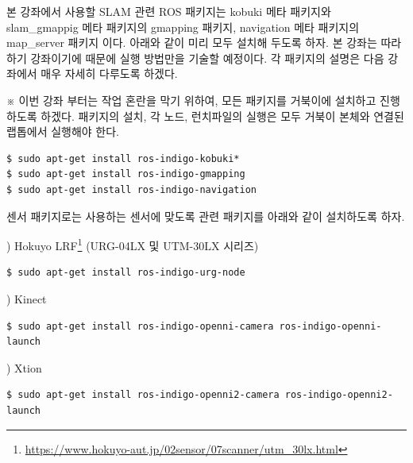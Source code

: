 본 강좌에서 사용할 SLAM 관련 ROS 패키지는 kobuki 메타 패키지와 slam\_gmappig 메타 패키지의 gmapping 패키지, navigation 메타 패키지의 map\_server 패키지 이다. 아래와 같이 미리 모두 설치해 두도록 하자. 본 강좌는 따라하기 강좌이기에 때문에 실행 방법만을 기술할 예정이다. 각 패키지의 설명은 다음 강좌에서 매우 자세히 다루도록 하겠다. 

※ 이번 강좌 부터는 작업 혼란을 막기 위하여, 모든 패키지를 거북이에 설치하고 진행하도록 하겠다. 패키지의 설치, 각 노드, 런치파일의 실행은 모두 거북이 본체와 연결된 랩톱에서 실행해야 한다.

\vspace{\baselineskip}
\begin{lstlisting}[language=ROS]
$ sudo apt-get install ros-indigo-kobuki*
$ sudo apt-get install ros-indigo-gmapping
$ sudo apt-get install ros-indigo-navigation
\end{lstlisting}

센서 패키지로는 사용하는 센서에 맞도록 관련 패키지를 아래와 같이 설치하도록 하자.

\setcounter{num}{0}

\vspace{\baselineskip}
\noindent
{}
\thenum) Hokuyo LRF\footnote{\url{https://www.hokuyo-aut.jp/02sensor/07scanner/utm_30lx.html}} (URG-04LX 및 UTM-30LX 시리즈)

\vspace{\baselineskip}
\begin{lstlisting}[language=ROS]
$ sudo apt-get install ros-indigo-urg-node
\end{lstlisting}
 
\vspace{\baselineskip}
\noindent
{}
\thenum) Kinect

\vspace{\baselineskip}
\begin{lstlisting}[language=ROS]
$ sudo apt-get install ros-indigo-openni-camera ros-indigo-openni-launch
\end{lstlisting}


\vspace{\baselineskip}
\noindent
{}
\thenum) Xtion

\vspace{\baselineskip}
\begin{lstlisting}[language=ROS]
$ sudo apt-get install ros-indigo-openni2-camera ros-indigo-openni2-launch
\end{lstlisting}


